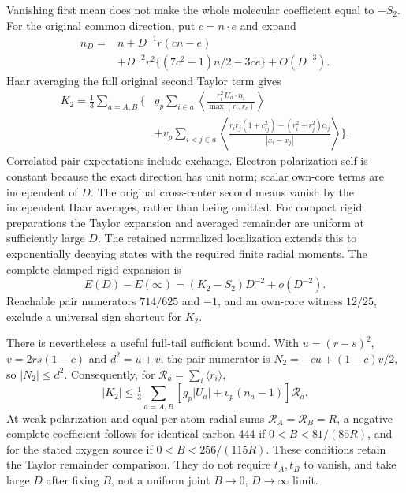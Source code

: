 Vanishing first mean does not make the whole molecular coefficient equal
to $-S_2$. For the original common direction, put $c=n\cdot e$ and expand
\begin{equation}
\begin{split}
 n_D={}&n+D^{-1}r(cn-e)\\
      &+D^{-2}r^2\{(7c^2-1)n/2-3ce\}+O(D^{-3}).
\end{split}
\end{equation}
Haar averaging the full original second Taylor term gives
\begin{equation}
\begin{split}
 K_2=\frac13\sum_{a=A,B}\bigg\{&g_p\sum_{i\in a}
   \left\langle\frac{r_i^2\,U_a\cdot n_i}{\max(r_i,r_c)}\right\rangle\\
 &+v_p\sum_{i<j\in a}\left\langle
 \frac{r_ir_j(1+c_{ij}^2)-(r_i^2+r_j^2)c_{ij}}
 {|x_i-x_j|}\right\rangle\bigg\}.
\end{split}
\end{equation}
Correlated pair expectations include exchange. Electron polarization self
is constant because the exact direction has unit norm; scalar own-core
terms are independent of $D$. The original cross-center second means
vanish by the independent Haar averages, rather than being omitted.
For compact rigid preparations the Taylor expansion and averaged remainder are uniform at sufficiently large $D$. The retained normalized localization extends this to exponentially decaying states with the required finite radial moments. The complete clamped rigid expansion is
\begin{equation}
 E(D)-E(\infty)=(K_2-S_2)D^{-2}+o(D^{-2}).
\end{equation}
Reachable pair numerators $714/625$ and $-1$, and an own-core witness
$12/25$, exclude a universal sign shortcut for $K_2$.

There is nevertheless a useful full-tail sufficient bound. With
$u=(r-s)^2$, $v=2rs(1-c)$ and $d^2=u+v$, the pair numerator is
$N_2=-cu+(1-c)v/2$, so $|N_2|\le d^2$.
Consequently, for $\mathcal R_a=\sum_i\langle r_i\rangle$,
\begin{equation}
 |K_2|\le\tfrac13\sum_{a=A,B}
              [g_p|U_a|+v_p(n_a-1)]\mathcal R_a.
\end{equation}
At weak polarization and equal per-atom radial sums
$\mathcal R_A=\mathcal R_B=R$, a negative complete coefficient follows
for identical carbon 444 if $0<B<81/(85R)$, and for the stated oxygen
source if $0<B<256/(115R)$. These conditions retain the Taylor remainder
comparison. They do not require $t_A,t_B$ to vanish, and take large $D$
after fixing $B$, not a uniform joint $B\to0$, $D\to\infty$ limit.

